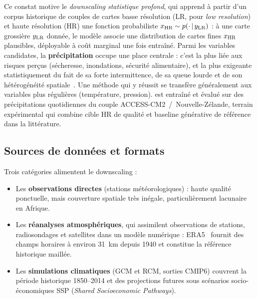 Ce constat motive le \emph{downscaling statistique profond}, qui apprend à partir d'un corpus historique de couples de cartes basse résolution (LR, pour \emph{low resolution}) et haute résolution (HR) une fonction probabiliste $x_{\text{HR}} \sim p(\cdot\,|\,y_{\text{LR}})$ : à une carte grossière $y_{\text{LR}}$ donnée, le modèle associe une distribution de cartes fines $x_{\text{HR}}$ plausibles, déployable à coût marginal une fois entraîné. Parmi les variables candidates, la \textbf{précipitation} occupe une place centrale : c'est la plus liée aux risques perçus (sécheresse, inondations, sécurité alimentaire), et la plus exigeante statistiquement du fait de sa forte intermittence, de sa queue lourde et de son hétérogénéité spatiale~\cite{maraun_widmann_2018,vandal_deepsd_2017}. Une méthode qui y réussit se transfère généralement aux variables plus régulières (température, pression). \Oracle{} est entraîné et évalué sur des précipitations quotidiennes du couple ACCESS-CM2~/~Nouvelle-Zélande, terrain expérimental qui combine cible HR de qualité et baseline générative de référence dans la littérature.

\label{sec:donnees}

\subsection{Sources de données et formats}
\label{ssec:sources}

Trois catégories alimentent le downscaling :
\begin{itemize}[leftmargin=1.2em, itemsep=2pt]
    \item Les \textbf{observations directes} (stations météorologiques) : haute qualité ponctuelle, mais couverture spatiale très inégale, particulièrement lacunaire en Afrique.
    \item Les \textbf{réanalyses atmosphériques}, qui assimilent observations de stations, radiosondages et satellites dans un modèle numérique : ERA5~\cite{hersbach_era5_2020} fournit des champs horaires à environ 31~km depuis 1940 et constitue la référence historique maillée.
    \item Les \textbf{simulations climatiques} (GCM et RCM, sorties CMIP6) couvrent la période historique 1850--2014 et des projections futures sous scénarios socio-économiques SSP (\emph{Shared Socioeconomic Pathways}).
\end{itemize}

